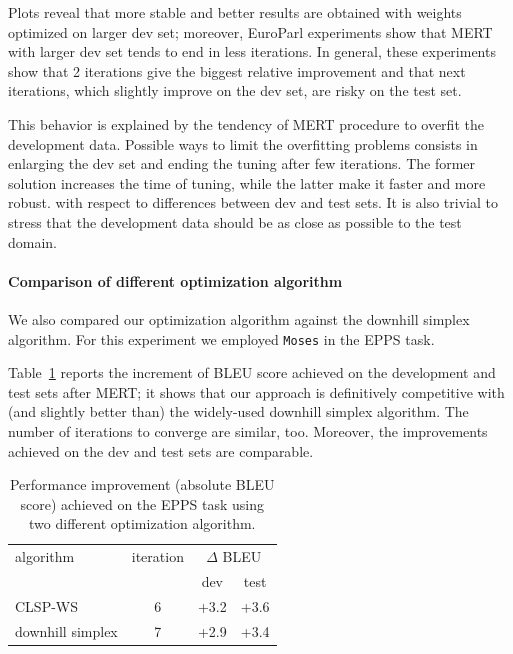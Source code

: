 \documentclass[10pt]{report}
\theoremstyle{plain}
\begin{document}
{Plots reveal that more stable and better results are obtained with weights optimized on larger dev set; moreover, EuroParl experiments show that MERT with larger dev set tends to end in less iterations.
In general, these experiments show that 2 iterations give the biggest relative  improvement and that next iterations, which slightly improve on the dev set, are risky on the test set.

This behavior is explained by the tendency of MERT procedure to overfit the development data. Possible ways to limit the overfitting problems consists in enlarging the dev set  and ending the tuning after few iterations.
The former solution increases the time of tuning, while the latter make it faster and more robust. with respect to differences between dev and test sets. It is also trivial to stress that the development  data should be as close as possible to the test domain.


\paragraph{Comparison of different optimization algorithm} We also compared our optimization algorithm against the downhill simplex algorithm. For this experiment we employed {\tt Moses} in the EPPS task.

Table~\ref{tbl:MERT-epps-algorithm} reports the increment of BLEU score achieved on the development and test sets after MERT; it shows that our approach is definitively competitive with (and slightly better than) the widely-used downhill simplex algorithm. The number of iterations to converge are similar, too.
Moreover, the improvements achieved on the dev and test sets are comparable.


 \begin{table}[ht]
\begin{center}
\label{tbl:MERT-epps-algorithm}
\begin{tabular}{l|ccc}
algorithm               & iteration & \multicolumn{2}{c}{$\Delta$ BLEU}\\
                                &                & dev & test\\
\hline
CLSP-WS              & 6 & +3.2 & +3.6 \\
downhill simplex  & 7 & +2.9  & +3.4\\
\end{tabular}
\caption{Performance improvement (absolute BLEU score) achieved on the EPPS task using two different optimization algorithm.}
\end{center}
\end{table}

}
\end{document}
